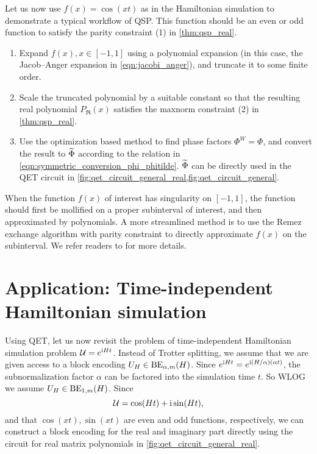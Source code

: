 Let us now use $f(x)=\cos(xt)$ as in the Hamiltonian simulation to demonstrate a typical workflow of QSP.
This function should be an even or odd function to satisfy the parity constraint (1) in \cref{thm:qsp_real}. 

\begin{enumerate}

\item Expand $f(x),x\in[-1,1]$ using a polynomial expansion (in this case, the Jacob--Anger expansion in \cref{eqn:jacobi_anger}), and truncate it to some finite order.

\item Scale the truncated polynomial by a suitable constant so that the resulting real polynomial $P_{\Re}(x)$ satisfies the maxnorm constraint (2) in \cref{thm:qsp_real}. 
\item Use the optimization based method to find phase factors $\Phi^W=\Phi$, and convert the result to $\widetilde{\Phi}$ according to the relation in \cref{eqn:symmetric_conversion_phi_phitilde}. $\widetilde{\Phi}$ can be directly used in the QET circuit in \cref{fig:qet_circuit_general_real,fig:qet_circuit_general}.
\end{enumerate}

\begin{rem}
When the function $f(x)$ of interest has singularity on $[-1,1]$, the function should first be mollified on a proper subinterval of interest, and then approximated by polynomials. A more streamlined method is to use the Remez exchange algorithm with parity constraint to directly approximate $f(x)$ on the subinterval.
We refer readers to \cite[Appendix E]{DongMengWhaleyEtAl2021} for more details.
\end{rem}




\section{Application: Time-independent Hamiltonian simulation}\label{sec:qsp_hamsim}

Using QET, let us now revisit the problem of time-independent Hamiltonian simulation problem $\mathcal{U}=e^{\mathrm{i} H t}$. Instead of Trotter splitting, we assume that we are given access to a block encoding $U_H\in\operatorname{BE}_{\alpha,m}(H)$.
Since $e^{\mathrm{i} H t}=e^{\mathrm{i} (H/\alpha) (\alpha t)}$, the subnormalization factor $\alpha$ can be factored into the simulation time $t$. So WLOG we assume $U_H\in\operatorname{BE}_{1,m}(H)$.
Since
\begin{equation}
\mathcal{U}=\cos(Ht)+\mathrm{i} \sin(Ht),
\end{equation} 
and that $\cos(xt),\sin(xt)$ are even and odd functions, respectively, we can construct a block encoding for the real and imaginary part directly using the circuit for real matrix polynomials in \cref{fig:qet_circuit_general_real}.

